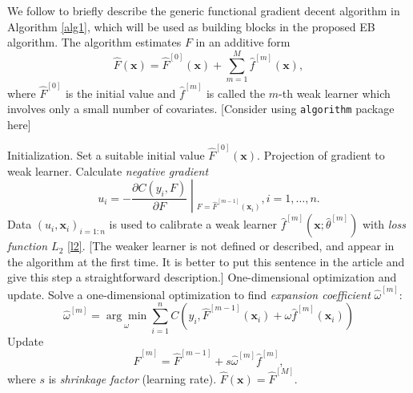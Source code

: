 \documentclass[11pt]{article}
\numberwithin{equation}{section}
\def\bx{\boldsymbol{x}}
\begin{document}
We follow \citet{buehlmann:2003} to briefly describe the generic functional gradient decent algorithm in Algorithm \ref{alg1}, which will be used as building blocks in the proposed EB algorithm. 
The algorithm estimates $F$ in an additive form
$$\hat{F}(\bx)=\hat{F}^{[0]}(\bx)+\sum_{m=1}^M\hat{f}^{[m]}(\bx),$$
where $\hat{F}^{[0]}$ is the initial value and $\hat{f}^{[m]}$ is called the $m$-th weak learner which involves only a small number of covariates.
{\color{blue}[Consider using {\tt algorithm} package here]}
\begin{algorithm}[htp!] %
	\caption{The generic functional gradient decent algorithm.} %
	\label{alg1} %
	\begin{algorithmic}[1] %
		\STATE Initialization. Set a suitable initial value $\hat{F}^{[0]}(\bx).$  
		\STATE Projection of gradient to weak learner.
		Calculate \textit{negative gradient} $$u_i=\left.-\frac{\partial C(y_i,F)}{\partial F}\middle|_{F=\hat{F}^{[m-1]}(\bx_i)}\right., i=1,\ldots,n.$$
		Data $(u_i,\bx_i)_{i=1:n}$ is used to calibrate a weak learner $\hat{f}^{[m]}(\bx;\hat{\theta}^{[m]})$ with \textit{loss function $L_2$} \eqref{l2}.{\color{blue} [The weaker learner is not defined or described, and appear in the algorithm at the first time. It is better to put this sentence in the article and give this step a straightforward description.]}
		\STATE One-dimensional optimization and update.
		Solve a one-dimensional optimization  to find \textit{expansion coefficient} $\hat{\omega}^{[m]}$:
		$$\hat{\omega}^{[m]}=\underset{\omega}{\arg\min}\sum_{i=1}^n C(y_i, \hat{F}^{[m-1]}(\bx_i)+\omega\hat{f}^{[m]}(\bx_i))$$
		Update $$\hat{F}^{[m]}=\hat{F}^{[m-1]}+s\hat{\omega}^{[m]}\hat{f}^{[m]},$$
		where $s$ is \textit{shrinkage factor} (learning rate).
		\ENDFOR
		\RETURN $\hat{F}(\bx)=\hat{F}^{[M]}$.
	\end{algorithmic}
\end{algorithm}
\end{document}
